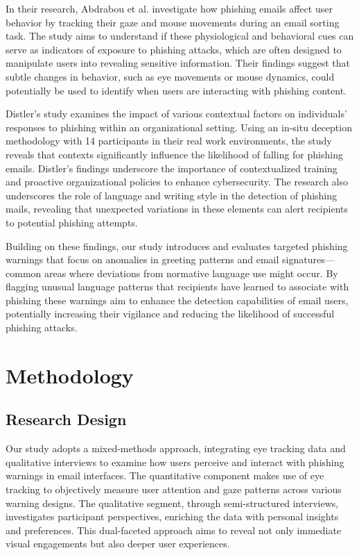 \documentclass[
  a4paper,  %
  twoside,  %
  bibliography=totoc,
  headsepline,
  cleardoublepage=empty,
  parskip=half,
  draft=false
]{scrbook}
\begin{document}
In their research, Abdrabou et al. \cite{abdrabou} investigate how phishing emails affect user behavior by tracking their gaze and mouse movements during an email sorting task. The study aims to understand if these physiological and behavioral cues can serve as indicators of exposure to phishing attacks, which are often designed to manipulate users into revealing sensitive information. Their findings suggest that subtle changes in behavior, such as eye movements or mouse dynamics, could potentially be used to identify when users are interacting with phishing content. 

Distler's study \cite{distler} examines the impact of various contextual factors on individuals' responses to phishing within an organizational setting. Using an in-situ deception methodology with 14 participants in their real work environments, the study reveals that contexts significantly influence the likelihood of falling for phishing emails. Distler's findings underscore the importance of contextualized training and proactive organizational policies to enhance cybersecurity. The research also underscores the role of language and writing style in the detection of phishing mails, revealing that unexpected variations in these elements can alert recipients to potential phishing attempts. 

Building on these findings, our study introduces and evaluates targeted phishing warnings that focus on anomalies in greeting patterns and email signatures—common areas where deviations from normative language use might occur. By flagging unusual language patterns that recipients have learned to associate with phishing these warnings aim to enhance the detection capabilities of email users, potentially increasing their vigilance and reducing the likelihood of successful phishing attacks. 

\chapter{Methodology}
\label{sec:methodology}
\section{Research Design}
Our study adopts a mixed-methods approach, integrating eye tracking data and qualitative interviews to examine how users perceive and interact with phishing warnings in email interfaces. The quantitative component makes use of eye tracking to objectively measure user attention and gaze patterns across various warning designs. The qualitative segment, through semi-structured interviews, investigates participant perspectives, enriching the data with personal insights and preferences. This dual-faceted approach aims to reveal not only immediate visual engagements but also deeper user experiences.
\end{document}
